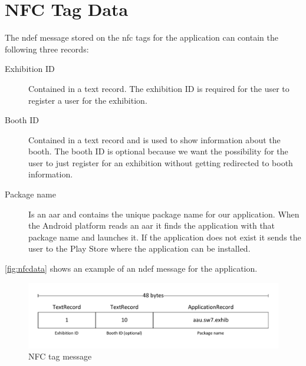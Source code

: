 \section{NFC Tag Data}

The \ac{ndef} message stored on the \ac{nfc} tags for the application can contain the following three records:

\begin{description}
\item[Exhibition ID] Contained in a text record. The exhibition ID is required for the user to register a user for the exhibition.
\item[Booth ID] Contained in a text record and is used to show information about the booth. The booth ID is optional because we want the possibility for the user to just register for an exhibition without getting redirected to booth information.
\item[Package name] Is an \ac{aar} and contains the unique package name for our application. When the Android platform reads an \ac{aar} it finds the application with that package name and launches it. If the application does not exist it sends the user to the Play Store where the application can be installed.
\end{description}
\autoref{fig:nfcdata} shows an example of an \ac{ndef} message for the application.

\begin{figure}[H]
\centering
\includegraphics[width=\columnwidth]{img/nfctag.pdf}
\caption{NFC tag message}
\label{fig:nfcdata}
\end{figure}
